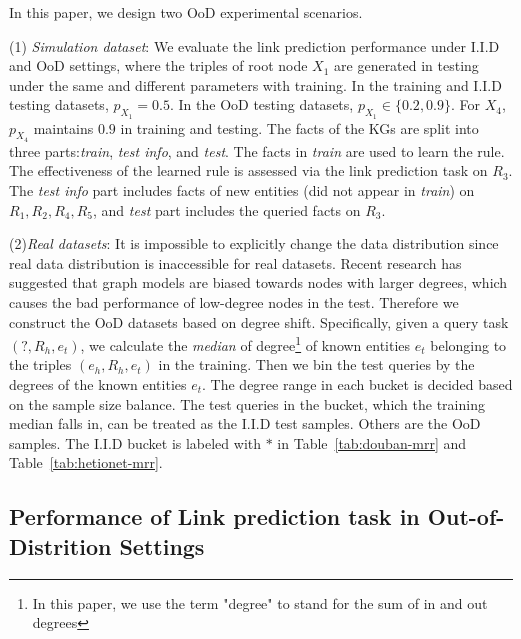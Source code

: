In this paper, we design two OoD experimental scenarios.

\noindent
(1) \textit{Simulation dataset}:
We evaluate the link prediction performance under I.I.D and OoD settings, where the triples of root node $X_1$ are generated in testing under the same and different parameters with training.
In the training and I.I.D testing datasets, $p_{X_1}=0.5$.
In the OoD testing datasets, $p_{X_1} \in \{0.2,0.9\}$.
For $X_4$, $p_{X_4}$ maintains $0.9$ in training and testing.
The facts of the KGs are split into three parts:\textit{train}, \textit{test info}, and \textit{test}.
The facts in \textit{train} are used to learn the rule.
The effectiveness of the learned rule is assessed via the link prediction task on $R_3$.
The \textit{test info} part includes facts of new entities (did not appear in \textit{train}) on $R_1, R_2, R_4, R_5$, and \textit{test} part includes the queried facts on $R_3$.

\noindent
(2)\textit{Real datasets}:
It is impossible to explicitly change the data distribution since real data distribution is inaccessible for real datasets.
Recent research\cite{tang2020investigating,wu2021self} has suggested that graph models are biased towards nodes with larger degrees, which causes the bad performance of low-degree nodes in the test.
Therefore we construct the OoD datasets based on degree shift.
Specifically, given a query task $(?,R_h,e_t)$, we calculate the \textit{median} of degree\footnote{In this paper, we use the term "degree" to stand for the sum of in and out degrees} of known entities $e_t$ belonging to the triples $(e_h,R_h,e_t)$ in the training.
Then we bin the test queries by the degrees of the known entities $e_t$.
The degree range in each bucket is decided based on the sample size balance.
The test queries in the bucket, which the training median falls in, can be treated as the I.I.D test samples.
Others are the OoD samples.
The I.I.D bucket is labeled with $*$ in Table~\ref{tab:douban-mrr} and Table~\ref{tab:hetionet-mrr}.





\subsection{Performance of Link prediction task in Out-of-Distrition Settings}

